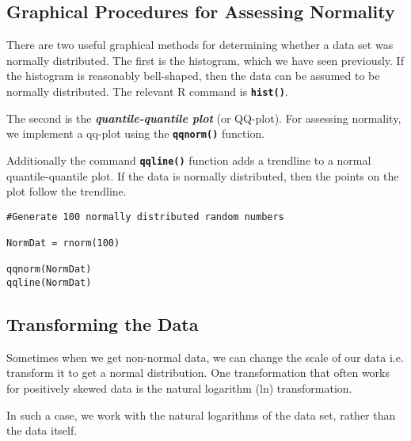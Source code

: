 \subsection{Graphical Procedures for Assessing Normality}
There are two useful graphical methods for determining whether a data set was normally distributed. The first is the histogram, which we have seen previously. If the histogram is reasonably bell-shaped, then the data can be assumed to be normally distributed. The relevant R command is \texttt{\textbf{hist()}}.


The second is the \textbf{\emph{quantile-quantile plot}} (or QQ-plot).
For assessing normality, we implement a qq-plot  using the \texttt{\textbf{qqnorm()}} function.

Additionally the command \texttt{\textbf{qqline()}} function adds a trendline to a normal quantile-quantile plot. If the data is normally distributed, then the points on the plot follow the trendline.

\begin{framed}
\begin{verbatim}
#Generate 100 normally distributed random numbers

NormDat = rnorm(100)

qqnorm(NormDat)
qqline(NormDat)
\end{verbatim}
\end{framed}

\subsection{Transforming the Data}

Sometimes when we get non-normal data, we can change the scale of our data i.e. transform it to get a normal distribution. One transformation that often works for positively skewed data is the natural logarithm (ln) transformation.

In such a case, we work with the natural logarithms of the data set, rather than the data itself.


